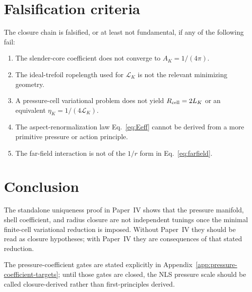 \documentclass[11pt]{article}
\newcommand{\LK}{\mathcal L_K}
\begin{document}
\section{Falsification criteria}

The closure chain is falsified, or at least not fundamental, if any of the following fail:
\begin{enumerate}[label=(F\arabic*)]
\item The slender-core coefficient does not converge to \(A_K=1/(4\pi)\).
\item The ideal-trefoil ropelength used for \(\LK\) is not the relevant minimizing geometry.
\item A pressure-cell variational problem does not yield \(R_{\rm cell}=2L_K\) or an equivalent
      \(\eta_K=1/(4\LK)\).
\item The aspect-renormalization law Eq.~\eqref{eq:Eeff} cannot be derived from a more primitive
      pressure or action principle.
\item The far-field interaction is not of the \(1/r\) form in Eq.~\eqref{eq:farfield}.
\end{enumerate}

\section{Conclusion}


The standalone uniqueness proof in Paper~IV shows that the pressure manifold,
shell coefficient, and radius closure are not independent tunings once the
minimal finite-cell variational reduction is imposed.  Without Paper~IV they
should be read as closure hypotheses; with Paper~IV they are consequences of
that stated reduction.


The pressure-coefficient gates are stated explicitly in Appendix~\ref{app:pressure-coefficient-targets}; until those gates are closed, the NLS pressure scale should be called closure-derived rather than first-principles derived.
\end{document}
